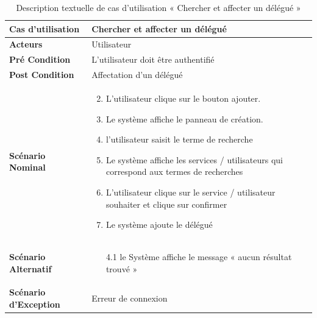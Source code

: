 \begin{longtable}{|p{5cm}|p{10cm}|}
  \caption{Description textuelle de cas d'utilisation « Chercher et affecter un délégué      »} \label{tab:use_case_search_delegate} \\
\hline
\textbf{Cas d'utilisation}&Chercher et affecter un délégué      \\
\hline
\textbf{Acteurs}&Utilisateur\\
\hline
\textbf{Pré Condition}&L'utilisateur doit être authentifié\\
\hline
\textbf{Post Condition}&Affectation d'un délégué \\
\hline
\textbf{Scénario Nominal}&
\vspace{-\baselineskip}
\begin{enumerate}
  \setcounter{enumi}{1}
  \item L'utilisateur clique sur le bouton ajouter.
  \item Le système affiche le panneau de création.
  \item l'utilisateur saisit le terme de recherche
  \item Le système affiche les services / utilisateurs qui correspond aux termes de recherches
  \item L'utilisateur clique sur le service / utilisateur souhaiter et clique sur confirmer 
  \item Le système ajoute le délégué 
\end{enumerate}\\
\hline
\textbf{Scénario Alternatif}&
\vspace{-\baselineskip}
\begin{enumerate}
 \item [4.1] le Système affiche le message « aucun résultat trouvé » 
\end{enumerate}\\
\hline
\textbf{Scénario d'Exception}&
Erreur de connexion\\
\hline

\end{longtable}



